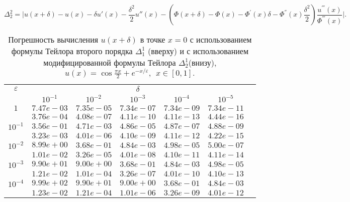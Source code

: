\documentclass[10pt,twoside]{uz_kgu}
\begin{document}
	$$ \Delta_2^2 = \Big|u(x + \delta) - u(x)-\delta u'(x)  -\frac{\delta^2}{2}u''(x) - (\Phi(x+\delta) - \Phi(x) -  \Phi^{'}(x)\delta - \Phi^{''}(x)\frac{\delta^2}{2}  )\frac{u^{'''}(x)}{\Phi^{'''}(x)} \Big|.$$
	\newpage
	\begin{table} [!htb]
		\caption {Погрешность вычисления $u(x+ \delta)$ в точке $x=0$ с использованием формулы Тейлора второго порядка $\Delta_1^1$ (вверху) и с использованием модифицированной формулы Тейлора $\Delta_2^1$(внизу),
		$u(x)=  \cos \frac{\pi x}{2} + e^{-x/\varepsilon} ,\ \    x\in [0,1].$}
        \begin{center}
	\begin{tabular}{|c|c|c|c|c|c|c}
		\cline{1-6} $\varepsilon$ & \multicolumn{5}{c|}{$\delta$} \\
		\cline{2-6} &$10^{-1}$ & $10^{-2}$ & $10^{-3}$  & $10^{-4}$& $10^{-5}$\\
		\cline{1-6}
		$1$
		&$7.47e-03$&$7.35e-05$&$7.34e-07$&$7.34e-09$& $7.34e-11$\\
		&$3.76e-04$&$4.08e-07$&$4.11e-10$&$4.11e-13$& $4.44e-16$\\
		\cline{1-6}
		$10^{-1}$
		&$3.56e-01$&$4.71e-03$&$4.86e-05$&$4.87e-07$&$4.88e-09$\\
		&$3.23e-03$&$4.01e-06$&$4.10e-09$&$4.11e-12$&$4.22e-15$\\
		\cline{1-6}
		$10^{-2}$
		&$8.99e+00$&$3.68e-01$&$4.84e-03$&$4.98e-05$&$5.00e-07$\\
		&$1.01e-02$&$3.26e-05$&$4.01e-08$&$4.10e-11$&$4.11e-14$\\
		\cline{1-6}
		$10^{-3}$
		&$9.90e+01$&$9.00e+00$&$3.68e-01$&$4.84e-03$&$4.98e-05$\\
		&$1.21e-02$&$1.01e-04$&$3.26e-07$&$4.01e-10$&$4.10e-13$\\
		\cline{1-6}
		$10^{-4}$
		&$9.99e+02$&$9.90e+01$&$9.00e+00$&$3.68e-01$&$4.84e-03$\\
		&$1.23e-02$&$1.21e-04$&$1.01e-06$&$3.26e-09$&$4.01e-12$\\
		\cline{1-6}
	\end{tabular}
\end{center}
\end{table}
	
	
	
	
\end{document}
